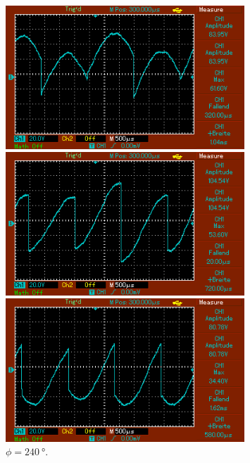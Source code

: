 \begin{figure}
\begin{minipage}{0.5\textwidth}
        \caption{$\phi = \SI{120}{\degree}$.} 
        \label{fig:23}
    \end{minipage}
    \hfill
    \begin{minipage}{0.5\textwidth}
        \centering
        \includegraphics[width=0.8\textwidth]{bilder/180mit.png}
        \caption{$\phi = \SI{180}{\degree}$.} 
        \label{fig:24}
    \end{minipage}
    \vspace{1cm}
    \vfill
    \begin{minipage}{0.5\textwidth}
        \centering
        \includegraphics[width=0.8\textwidth]{bilder/240mit.png}
        \caption{$\phi = \SI{240}{\degree}$.} 
        \label{fig:25}
    \end{minipage}
    \hfill
    \begin{minipage}{0.5\textwidth}
        \centering
        \includegraphics[width=0.8\textwidth]{bilder/300mit.png}

\end{minipage}
\end{figure}
